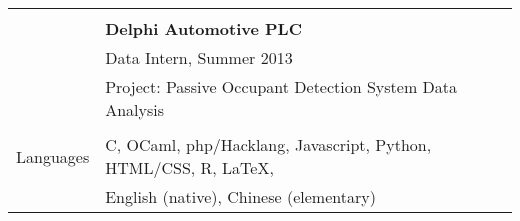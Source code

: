 \documentclass[letterpaper,11pt,oneside]{article}
\begin{document}
\begin{tabular}{@{} l l}
     & \\
     & \textbf{Delphi Automotive PLC} \\
     & Data Intern, Summer 2013 \\
     & Project: Passive Occupant Detection System Data Analysis \\
     & \\
  \Large{Languages}   & C, OCaml, php/Hacklang, Javascript, Python, HTML/CSS, R, \LaTeX, \\
  & English (native), Chinese (elementary) \\
\end{tabular}
\end{document}
